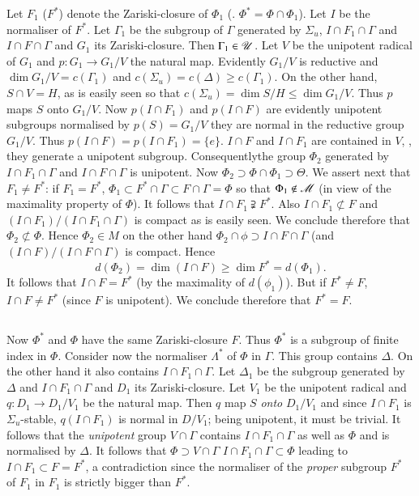 Let $F_1$ (\resp $F^\ast$) denote the Zariski-closure of $\Phi_1$ (\resp. $\Phi^\ast = \Phi \cap \Phi_1$). Let $I$ be the normaliser of $F^\ast$. Let $\Gamma_1$ be the subgroup of $\Gamma$ generated by $\Sigma_u$, $I \cap F_1 \cap \Gamma$ and $I \cap F \cap \Gamma$ and $G_1$ its Zariski-closure. Then $\Gamma_1 \in \mathscr{U}$. Let $V$ be the unipotent radical of $G_1$ and $p: G_1 \to G_1 / V$ the natural map. Evidently $G_1 / V$ is reductive and $\dim G_1/ V = c(\Gamma_1)$ and $c(\Sigma_u) = c (\Delta) \geqslant c(\Gamma_1)$. On the other hand, $S \cap V = H$, as is easily seen so that $c (\Sigma_u) = \dim S/ H \leqslant \dim G_1 / V$. Thus $p$ maps $S$ onto $G_1/V$. Now $p(I \cap F_1)$ and $p(I \cap F)$ are evidently unipotent subgroups normalised by $p(S) = G_1 / V$ \ie they are normal in the reductive group $G_1/ V$. Thus $p(I \cap F) = p (I \cap F_1)=\{e\}$. $I \cap F$ and $I \cap F_1$ are contained in $V$, \ie, they generate a unipotent subgroup. Consequently\pageoriginale the group $\Phi_2$ generated by $I \cap F_1 \cap \Gamma$ and $I \cap F \cap \Gamma$ is unipotent. Now $\Phi_2 \supset \Phi \cap \Phi_1 \supset \Theta$. We assert next that $F_1 \neq F^\ast$: if $F_1 = F^\ast$, $\Phi_1 \subset F^\ast \cap \Gamma \subset F \cap \Gamma = \Phi$ so that $\Phi_1 \not\in \mathscr{M}$ (in view of the maximality property of $\Phi$). It follows that $I \cap F_1 \supsetneqq F^\ast$. Also $I \cap F_1 \not\subset F$ and $(I \cap F_1)/ (I\cap F_1 \cap \Gamma)$ is compact as is easily seen. We conclude therefore that $\Phi_2 \not\subset \Phi$. Hence $\Phi_2 \in M$ on the other hand $\Phi_2 \cap \phi \supset I \cap F \cap \Gamma$ (and $(I \cap F)/ (I \cap F \cap \Gamma)$ is compact. Hence
$$
d (\Phi_2) = \dim (I \cap F) \geqslant \dim F^\ast = d (\Phi_1).
$$
It follows that $I \cap F = F^\ast$ (by the maximality of $d(\phi_1)$). But if $F^\ast \neq F$, $I \cap F \neq F^\ast$ (since $F$ is unipotent). We conclude therefore that $F^\ast = F$.

\subsection{}\label{art9-subsec2.23}
Now $\Phi^\ast$ and $\Phi$ have the same Zariski-closure $F$. Thus $\Phi^\ast$ is a subgroup of finite index in $\Phi$. Consider now the normaliser $\Lambda^\ast$ of $\Phi$ in $\Gamma$. This group contains $\Delta$. On the other hand it also contains $I \cap F_1 \cap \Gamma$. Let $\Delta_1$ be the subgroup generated by $\Delta$ and $I \cap F_1 \cap \Gamma$ and $D_1$ its Zariski-closure. Let $V_1$ be the unipotent radical and $q : D_1 \to D_1 / V_1$ be the natural map. Then $q$ map $S$ \textit{ onto } $D_1/ V_1$ and since $I \cap F_1$ is $\Sigma_u$-stable, $q (I \cap F_1)$ is normal in $D/V_1$; being unipotent, it must be trivial. It follows that the \textit{ unipotent } group $V \cap \Gamma$ contains $I \cap F_1 \cap \Gamma$ as well as $\Phi$ and is normalised by $\Delta$. It follows that $\Phi \supset V \cap \Gamma$ \ie $I \cap F_1 \cap \Gamma \subset \Phi$ leading to $I \cap F_1 \subset F = F^\ast$, a contradiction since the normaliser of the \textit{proper} subgroup $F^\ast$ of $F_1$ in $F_1$ is strictly bigger than $F^\ast$.

